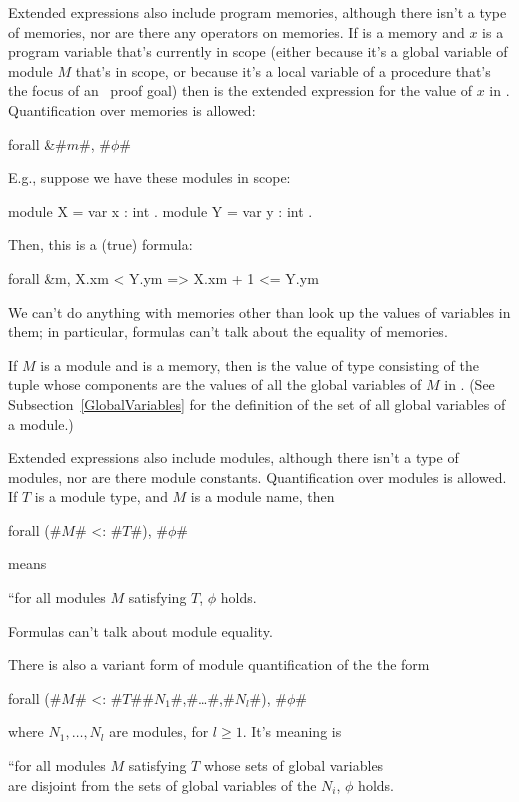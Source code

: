 Extended expressions also include program memories, although there
isn't a type of memories, nor are there any operators on memories.  If
 is a memory and $x$ is a program variable that's currently
in scope (either because it's a global variable of module $M$ that's
in scope, or because it's a local variable of a procedure that's the
focus of an \EasyCrypt\ proof goal) then  is the
extended expression for the value of $x$ in .  Quantification
over memories is allowed:
\begin{easycrypt}{}{}
forall &#$m$#, #$\phi$#
\end{easycrypt}
E.g., suppose we have these modules in scope:
\begin{easycrypt}{}{}
module X = { var x : int }.
module Y = { var y : int }.
\end{easycrypt}
Then, this is a (true) formula:
\begin{easycrypt}{}{}
forall &m, X.x{m} < Y.y{m} => X.x{m} + 1 <= Y.y{m}
\end{easycrypt}
We can't do anything with memories other than look up
the values of variables in them; in particular, formulas can't
talk about the equality of memories.

If $M$ is a module and  is a memory, then  is the value of type  consisting of the
tuple whose components are the values of all the global variables of
$M$ in .  (See Subsection~\ref{GlobalVariables} for the
definition of the set of all global variables of a module.)

Extended expressions also include modules, although there isn't a type
of modules, nor are there module constants. Quantification over modules is
allowed. If $T$ is a module type, and $M$ is a module name, then
\begin{easycrypt}{}{}
forall (#$M$# <: #$T$#), #$\phi$#
\end{easycrypt}
means
\begin{center}
 ``for all modules $M$ satisfying $T$, $\phi$ holds.
\end{center}
Formulas can't talk about module equality.

There is also a variant form of module quantification of the
the form
\begin{easycrypt}{}{}
forall (#$M$# <: #$T$#{#$N_1$#,#\ldots#,#$N_l$#}), #$\phi$#
\end{easycrypt}
where $N_1,\ldots,N_l$ are modules, for $l\geq 1$. It's meaning is
\begin{center}
  ``for all modules $M$ satisfying $T$ whose sets of global
  variables\\are disjoint from the sets of global variables of the
  $N_i$, $\phi$ holds.
\end{center}


